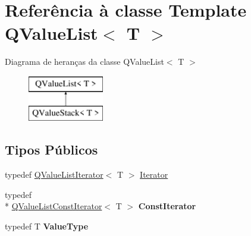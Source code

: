 \hypertarget{class_q_value_list}{\section{Referência à classe Template Q\-Value\-List$<$ T $>$}
\label{class_q_value_list}
}
Diagrama de heranças da classe Q\-Value\-List$<$ T $>$\begin{figure}[H]
\begin{center}
\leavevmode
\includegraphics[height=2.000000cm]{class_q_value_list}
\end{center}
\end{figure}
\subsection*{Tipos Públicos}
\begin{DoxyCompactItemize}
\item 
typedef \hyperlink{class_q_value_list_iterator}{Q\-Value\-List\-Iterator}$<$ T $>$ \hyperlink{class_q_value_list_a1f559ae0c1d2e8f55846ea5d1ea60977}{Iterator}
\item 
\hypertarget{class_q_value_list_ac66ccf2284ef98587f5c446c69ce1010}{typedef \\*
\hyperlink{class_q_value_list_const_iterator}{Q\-Value\-List\-Const\-Iterator}$<$ T $>$ {\bfseries Const\-Iterator}}\label{class_q_value_list_ac66ccf2284ef98587f5c446c69ce1010}

\item 
\hypertarget{class_q_value_list_a215e2850ed819f54851fa725fdc8842c}{typedef T {\bfseries Value\-Type}}\label{class_q_value_list_a215e2850ed819f54851fa725fdc8842c}

\end{DoxyCompactItemize}
